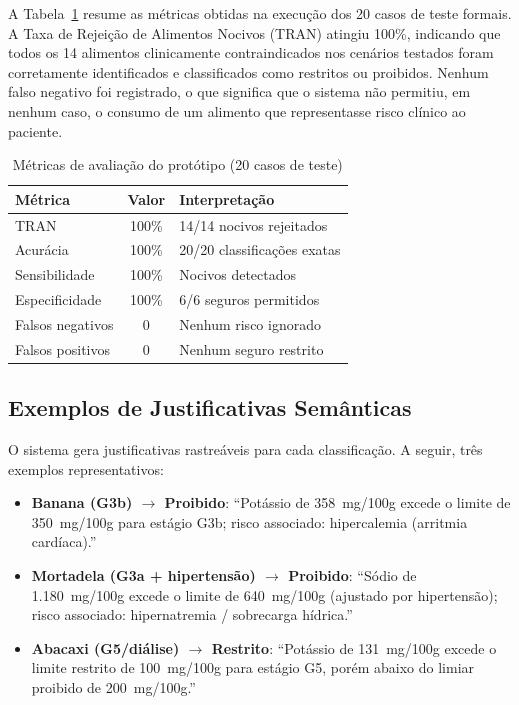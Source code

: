 \documentclass[12pt, a4paper, twocolumn]{article}
\begin{document}
A Tabela~\ref{tab:metricas} resume as métricas obtidas na execução dos 20 casos de teste formais. A Taxa de Rejeição de Alimentos Nocivos (TRAN) atingiu 100\%, indicando que todos os 14 alimentos clinicamente contraindicados nos cenários testados foram corretamente identificados e classificados como restritos ou proibidos. Nenhum falso negativo foi registrado, o que significa que o sistema não permitiu, em nenhum caso, o consumo de um alimento que representasse risco clínico ao paciente.

\begin{table}[h]
\centering
\caption{Métricas de avaliação do protótipo (20 casos de teste)}
\label{tab:metricas}
\footnotesize
\begin{tabular}{|p{2.2cm}|c|p{2.5cm}|}
\hline
\textbf{Métrica} & \textbf{Valor} & \textbf{Interpretação} \\
\hline
TRAN              & 100\% & 14/14 nocivos rejeitados \\
\hline
Acurácia          & 100\% & 20/20 classificações exatas \\
\hline
Sensibilidade     & 100\% & Nocivos detectados \\
\hline
Especificidade    & 100\% & 6/6 seguros permitidos \\
\hline
Falsos negativos  & 0     & Nenhum risco ignorado \\
\hline
Falsos positivos  & 0     & Nenhum seguro restrito \\
\hline
\end{tabular}
\end{table}

    \subsection{Exemplos de Justificativas Semânticas}

O sistema gera justificativas rastreáveis para cada classificação. A seguir, três exemplos representativos:

\begin{itemize}
    \item \textbf{Banana (G3b) $\rightarrow$ Proibido}: ``Potássio de 358~mg/100g excede o limite de 350~mg/100g para estágio G3b; risco associado: hipercalemia (arritmia cardíaca).''
    \item \textbf{Mortadela (G3a + hipertensão) $\rightarrow$ Proibido}: ``Sódio de 1.180~mg/100g excede o limite de 640~mg/100g (ajustado por hipertensão); risco associado: hipernatremia / sobrecarga hídrica.''
    \item \textbf{Abacaxi (G5/diálise) $\rightarrow$ Restrito}: ``Potássio de 131~mg/100g excede o limite restrito de 100~mg/100g para estágio G5, porém abaixo do limiar proibido de 200~mg/100g.''
\end{itemize}
\end{document}
